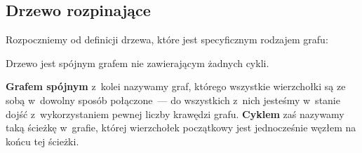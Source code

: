\subsection{Drzewo rozpinające}



Rozpoczniemy od definicji drzewa, które jest specyficznym rodzajem grafu:

\begin{definition}
	Drzewo jest spójnym grafem nie zawierającym żadnych cykli.
\end{definition}

\textbf{Grafem spójnym} z~kolei nazywamy graf, którego wszystkie wierzchołki są ze sobą w~dowolny sposób połączone~--- do wszystkich z~nich jesteśmy w~stanie dojść z~wykorzystaniem pewnej liczby krawędzi grafu.
\textbf{Cyklem} zaś nazywamy taką ścieżkę w~grafie, której wierzchołek początkowy jest jednocześnie węzłem na końcu tej ścieżki.

